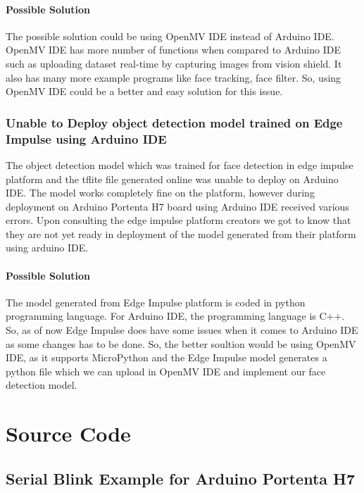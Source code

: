 	\subsubsection{Possible Solution}
	The possible solution could be using OpenMV IDE instead of Arduino IDE. OpenMV IDE has more number of functions when compared to Arduino IDE such as uploading dataset real-time by capturing images from vision shield. It also has many more example programs like face tracking, face filter. So, using OpenMV IDE could be a better and easy solution for this issue. 
	\subsection{Unable to Deploy object detection model trained on Edge Impulse using Arduino IDE }
	The object detection model which was trained for face detection in edge impulse platform and the tflite file generated online was unable to deploy on Arduino IDE. The model works completely fine on the platform, however during deployment on Arduino Portenta H7 board using Arduino IDE received various errors. Upon consulting the edge impulse platform creators we got to know that they are not yet ready in deployment of the model generated from their platform  using arduino IDE.
	\subsubsection{Possible Solution}
	The model generated from Edge Impulse platform is coded in python programming language. For Arduino IDE, the programming language is C++. So, as of now Edge Impulse does have some issues when it comes to Arduino IDE as some changes has to be done. So, the better soultion would be using OpenMV IDE, as it supports MicroPython and the Edge Impulse model generates a python file which we can upload in OpenMV IDE and implement our face detection model.
	
	\chapter{Source Code}
	
	\section{Serial Blink Example for Arduino Portenta H7 }

